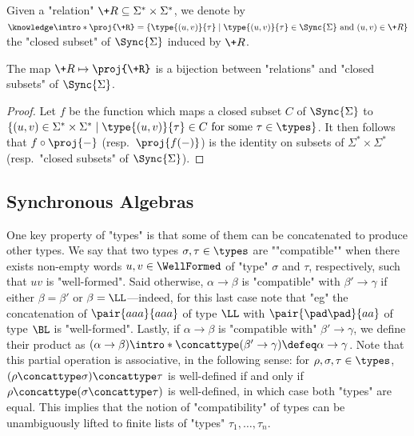 
Given a "relation" $\+R \subseteq \Sigma^* \times \Sigma^*$, we denote by
$\AP\intro*\proj{\+R} = \{\type{(u,v)}{\tau} \mid \type{(u,v)}{\tau} \in \Sync{\Sigma} \text{ and } (u,v) \in \+R\}$
the "closed subset" of $\Sync{\Sigma}$ induced by $\+R$.

\begin{fact}
	The map $\+R \mapsto \proj{\+R}$ is a bijection between
	"relations" and "closed subsets" of $\Sync{\Sigma}$.
\end{fact}

\begin{proof}
	Let $f$ be the function which maps a closed subset $C$ of $\Sync{\Sigma}$ to
	$\{(u,v) \in \Sigma^* \times \Sigma^* \mid \type{(u,v)}{\tau} \in C \text{ for some $\tau \in \types$} \}$. It then follows that $f\circ \proj{-}$ (resp.~$\proj{f(-)}$) is the identity
	on subsets of $\Sigma^* \times \Sigma^*$ (resp.~"closed subsets" of $\Sync{\Sigma}$).
\end{proof}

\subsection{Synchronous Algebras}

One key property of "types" is that some of them can be concatenated to produce other types.
We say that two types $\sigma, \tau \in \types$ are \AP""compatible""
when there exists non-empty words $u,v \in \WellFormed$ of "type" $\sigma$
and $\tau$, respectively, such that $uv$ is "well-formed".
Said otherwise, $\alpha \to \beta$ is "compatible" with $\beta' \to \gamma$
if either $\beta = \beta'$ or $\beta = \LL$---indeed, for this last case
note that "eg" the concatenation of $\pair{aaa}{aaa}$ of type $\LL$ with
$\pair{\pad\pad}{aa}$ of type $\BL$ is "well-formed".
Lastly, if $\alpha\to \beta$ is "compatible with" $\beta'\to\gamma$,
we define their product as \AP $(\alpha\to\beta)\intro*\concattype(\beta'\to\gamma) \defeq \alpha \to \gamma$.
Note that this partial operation is associative, in the following sense: for $\rho,\sigma,\tau \in \types$, $(\rho\concattype\sigma) \concattype \tau$ is well-defined if and only if
$\rho\concattype(\sigma\concattype \tau)$ is well-defined, in which case both "types" are equal.
This implies that the notion of "compatibility" of types can be unambiguously
lifted to finite lists of "types" $\tau_1,\hdots,\tau_n$.

